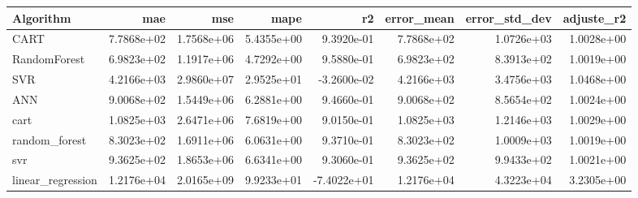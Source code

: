 \begin{tabular}{lrrrrrrr}
\toprule
Algorithm & mae & mse & mape & r2 & error_mean & error_std_dev & adjuste_r2 \\
\midrule
CART & 7.7868e+02 & 1.7568e+06 & 5.4355e+00 & 9.3920e-01 & 7.7868e+02 & 1.0726e+03 & 1.0028e+00 \\
RandomForest & 6.9823e+02 & 1.1917e+06 & 4.7292e+00 & 9.5880e-01 & 6.9823e+02 & 8.3913e+02 & 1.0019e+00 \\
SVR & 4.2166e+03 & 2.9860e+07 & 2.9525e+01 & -3.2600e-02 & 4.2166e+03 & 3.4756e+03 & 1.0468e+00 \\
ANN & 9.0068e+02 & 1.5449e+06 & 6.2881e+00 & 9.4660e-01 & 9.0068e+02 & 8.5654e+02 & 1.0024e+00 \\
cart & 1.0825e+03 & 2.6471e+06 & 7.6819e+00 & 9.0150e-01 & 1.0825e+03 & 1.2146e+03 & 1.0029e+00 \\
random_forest & 8.3023e+02 & 1.6911e+06 & 6.0631e+00 & 9.3710e-01 & 8.3023e+02 & 1.0009e+03 & 1.0019e+00 \\
svr & 9.3625e+02 & 1.8653e+06 & 6.6341e+00 & 9.3060e-01 & 9.3625e+02 & 9.9433e+02 & 1.0021e+00 \\
linear_regression & 1.2176e+04 & 2.0165e+09 & 9.9233e+01 & -7.4022e+01 & 1.2176e+04 & 4.3223e+04 & 3.2305e+00 \\
\bottomrule
\end{tabular}
